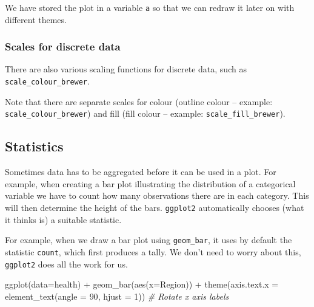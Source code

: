 \documentclass[
]{book}
\newenvironment{Shaded}{\begin{snugshade}}{\end{snugshade}}
\newcommand{\AttributeTok}[1]{\textcolor[rgb]{0.77,0.63,0.00}{#1}}
\newcommand{\CommentTok}[1]{\textcolor[rgb]{0.56,0.35,0.01}{\textit{#1}}}
\newcommand{\DecValTok}[1]{\textcolor[rgb]{0.00,0.00,0.81}{#1}}
\newcommand{\FunctionTok}[1]{\textcolor[rgb]{0.00,0.00,0.00}{#1}}
\newcommand{\NormalTok}[1]{#1}
\newcommand{\SpecialCharTok}[1]{\textcolor[rgb]{0.00,0.00,0.00}{#1}}
\begin{document}
We have stored the plot in a variable \texttt{a} so that we can redraw it later on with different themes.

\hypertarget{scales-for-discrete-data}{%
\subsubsection{Scales for discrete data}\label{scales-for-discrete-data}}

There are also various scaling functions for discrete data, such as \texttt{scale\_colour\_brewer}.

Note that there are separate scales for colour (outline colour -- example: \texttt{scale\_colour\_brewer}) and fill (fill colour -- example: \texttt{scale\_fill\_brewer}).

\hypertarget{statistics}{%
\subsection{Statistics}\label{statistics}}

Sometimes data has to be aggregated before it can be used in a plot. For example, when creating a bar plot illustrating the distribution of a categorical variable we have to count how many observations there are in each category. This will then determine the height of the bars. \texttt{ggplot2} automatically chooses (what it thinks is) a suitable statistic.

For example, when we draw a bar plot using \texttt{geom\_bar}, it uses by default the statistic \texttt{count}, which first produces a tally. We don't need to worry about this, \texttt{ggplot2} does all the work for us.

\begin{Shaded}
\begin{Highlighting}[]
\FunctionTok{ggplot}\NormalTok{(}\AttributeTok{data=}\NormalTok{health) }\SpecialCharTok{+}
    \FunctionTok{geom\_bar}\NormalTok{(}\FunctionTok{aes}\NormalTok{(}\AttributeTok{x=}\NormalTok{Region)) }\SpecialCharTok{+}
    \FunctionTok{theme}\NormalTok{(}\AttributeTok{axis.text.x =} \FunctionTok{element\_text}\NormalTok{(}\AttributeTok{angle =} \DecValTok{90}\NormalTok{, }\AttributeTok{hjust =} \DecValTok{1}\NormalTok{)) }\CommentTok{\# Rotate x axis labels}
\end{Highlighting}
\end{Shaded}
\end{document}
